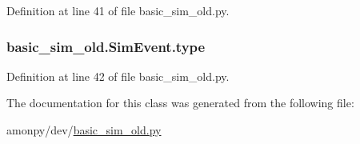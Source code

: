 Definition at line 41 of file basic\-\_\-sim\-\_\-old.\-py.

\hypertarget{classbasic__sim__old_1_1_sim_event_aa62ee00b9bd61aec1cf8d675e10bcdb1}{
\subsubsection[{type}]{\setlength{\rightskip}{0pt plus 5cm}basic\-\_\-sim\-\_\-old.\-Sim\-Event.\-type}}\label{classbasic__sim__old_1_1_sim_event_aa62ee00b9bd61aec1cf8d675e10bcdb1}


Definition at line 42 of file basic\-\_\-sim\-\_\-old.\-py.



The documentation for this class was generated from the following file\-:\begin{DoxyCompactItemize}
\item 
amonpy/dev/\hyperlink{basic__sim__old_8py}{basic\-\_\-sim\-\_\-old.\-py}\end{DoxyCompactItemize}

